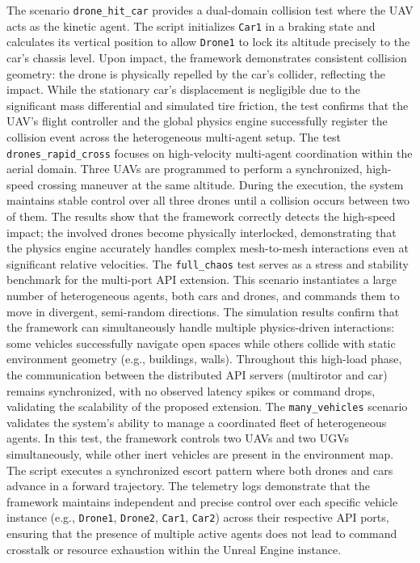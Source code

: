 The scenario \texttt{drone\_hit\_car} provides a dual-domain collision test where the UAV acts as the kinetic agent. The script initializes \texttt{Car1} in a braking state and calculates its vertical position to allow \texttt{Drone1} to lock its altitude precisely to the car's chassis level. Upon impact, the framework demonstrates consistent collision geometry: the drone is physically repelled by the car's collider, reflecting the impact. While the stationary car's displacement is negligible due to the significant mass differential and simulated tire friction, the test confirms that the UAV's flight controller and the global physics engine successfully register the collision event across the heterogeneous multi-agent setup.\newline\newline
The test \texttt{drones\_rapid\_cross} focuses on high-velocity multi-agent coordination within the aerial domain. Three UAVs are programmed to perform a synchronized, high-speed crossing maneuver at the same altitude. During the execution, the system maintains stable control over all three drones until a collision occurs between two of them. The results show that the framework correctly detects the high-speed impact; the involved drones become physically interlocked, demonstrating that the physics engine accurately handles complex mesh-to-mesh interactions even at significant relative velocities.\newline\newline
The \texttt{full\_chaos} test serves as a stress and stability benchmark for the multi-port API extension. This scenario instantiates a large number of heterogeneous agents, both cars and drones, and commands them to move in divergent, semi-random directions. The simulation results confirm that the framework can simultaneously handle multiple physics-driven interactions: some vehicles successfully navigate open spaces while others collide with static environment geometry (e.g., buildings, walls). Throughout this high-load phase, the communication between the distributed API servers (multirotor and car) remains synchronized, with no observed latency spikes or command drops, validating the scalability of the proposed extension.\newline\newline
The \texttt{many\_vehicles} scenario validates the system's ability to manage a coordinated fleet of heterogeneous agents. In this test, the framework controls two UAVs and two UGVs simultaneously, while other inert vehicles are present in the environment map. The script executes a synchronized escort pattern where both drones and cars advance in a forward trajectory. The telemetry logs demonstrate that the framework maintains independent and precise control over each specific vehicle instance (e.g., \texttt{Drone1}, \texttt{Drone2}, \texttt{Car1}, \texttt{Car2}) across their respective API ports, ensuring that the presence of multiple active agents does not lead to command crosstalk or resource exhaustion within the Unreal Engine instance.\newline\newline
